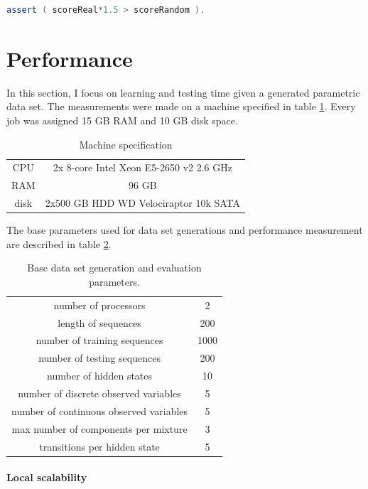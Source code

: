 \documentclass[thesis=B,english]{FITthesis}[2012/06/26]
\begin{document}
\begin{lstlisting}[language=Scala]
assert ( scoreReal*1.5 > scoreRandom ).
\end{lstlisting}

\section{Performance}

In this section, I focus on learning and testing time given a generated parametric data set. The measurements were made on a machine specified in table \ref{tab:machine-specification}. Every job was assigned 15 GB RAM and 10 GB disk space.

\begin{table}
\centering
\begin{tabular}{|c|c|}
	\hline
	CPU & 2x 8-core Intel Xeon E5-2650 v2 2.6 GHz \\
	RAM & 96 GB \\
	disk & 2x500 GB HDD WD Velociraptor 10k SATA \\
	\hline
\end{tabular}
\caption{Machine specification \cite{machine-specification}}
\label{tab:machine-specification}
\end{table}

The base parameters used for data set generations and performance measurement are described in table \ref{tab:base-parameters}.

\begin{table}
\centering
\begin{tabular}{|c|c|}
	\hline
	number of processors & 2 \\
	length of sequences & 200 \\
	number of training sequences & 1000 \\
	number of testing sequences & 200 \\
	number of hidden states & 10 \\
	number of discrete observed variables & 5 \\
	number of continuous observed variables & 5 \\
	max number of components per mixture & 3 \\
	transitions per hidden state & 5 \\
	\hline
\end{tabular}
\caption{Base data set generation and evaluation parameters.}
\label{tab:base-parameters}
\end{table}

\paragraph{Local scalability}
\end{document}

